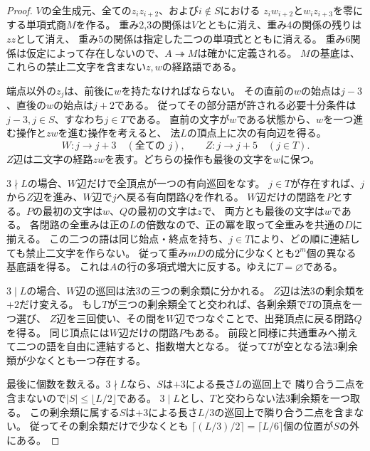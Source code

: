 \documentclass[11pt,a4paper]{ltjsarticle}
\theoremstyle{definition}
\begin{document}
\begin{proof}
$V$の全生成元、全ての$z_iz_{i+2}$、および$i\notin S$における
$z_iw_{i+2}$と$w_iz_{i+3}$を零にする単項式商$M$を作る。
重み2,3の関係は$V$とともに消え、重み4の関係の残りは$zz$として消え、
重み5の関係は指定した二つの単項式とともに消える。
重み6関係は仮定によって存在しないので、$A\twoheadrightarrow M$は確かに定義される。
$M$の基底は、これらの禁止二文字を含まない$z,w$の経路語である。

端点以外の$z_j$は、前後に$w$を持たなければならない。
その直前の$w$の始点は$j-3$、直後の$w$の始点は$j+2$である。
従ってその部分語が許される必要十分条件は$j-3,j\in S$、すなわち$j\in T$である。
直前の文字が$w$である状態から、$w$を一つ進む操作と$zw$を進む操作を考えると、
法$L$の頂点上に次の有向辺を得る。
\[
W:j\longrightarrow j+3\quad(\text{全ての }j),\qquad
Z:j\longrightarrow j+5\quad(j\in T).
\]
$Z$辺は二文字の経路$zw$を表す。どちらの操作も最後の文字を$w$に保つ。

$3\nmid L$の場合、$W$辺だけで全頂点が一つの有向巡回をなす。
$j\in T$が存在すれば、$j$から$Z$辺を進み、$W$辺で$j$へ戻る有向閉路$Q$を作れる。
$W$辺だけの閉路を$P$とする。$P$の最初の文字は$w$、$Q$の最初の文字は$z$で、
両方とも最後の文字は$w$である。
各閉路の全重みは正の$L$の倍数なので、正の冪を取って全重みを共通の$D$に揃える。
この二つの語は同じ始点・終点を持ち、$j\in T$により、どの順に連結しても禁止二文字を作らない。
従って重み$mD$の成分に少なくとも$2^m$個の異なる基底語を得る。
これは$A$の行の多項式増大に反する。ゆえに$T=\varnothing$である。

$3\mid L$の場合、$W$辺の巡回は法3の三つの剰余類に分かれる。
$Z$辺は法3の剰余類を$+2$だけ変える。
もし$T$が三つの剰余類全てと交われば、各剰余類で$T$の頂点を一つ選び、
$Z$辺を三回使い、その間を$W$辺でつなぐことで、出発頂点に戻る閉路$Q$を得る。
同じ頂点には$W$辺だけの閉路$P$もある。
前段と同様に共通重みへ揃えて二つの語を自由に連結すると、指数増大となる。
従って$T$が空となる法3剰余類が少なくとも一つ存在する。

最後に個数を数える。$3\nmid L$なら、$S$は$+3$による長さ$L$の巡回上で
隣り合う二点を含まないので$|S|\leq\lfloor L/2\rfloor$である。
$3\mid L$とし、$T$と交わらない法3剰余類を一つ取る。
この剰余類に属する$S$は$+3$による長さ$L/3$の巡回上で隣り合う二点を含まない。
従ってその剰余類だけで少なくとも
$\lceil(L/3)/2\rceil=\lceil L/6\rceil$個の位置が$S$の外にある。
\end{proof}
\end{document}
